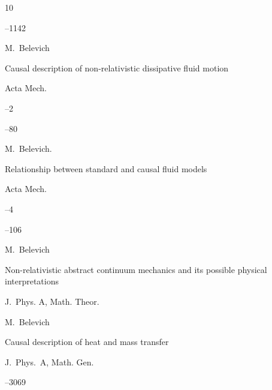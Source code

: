 \begin{thebibliography}{10}

--1142 







\by M.~Belevich

\paper Causal description of non-relativistic dissipative fluid motion

\jour  Acta Mech.

--2


--80







\by M.~Belevich.

\paper Relationship between standard and causal fluid models

\jour  Acta Mech.

--4


--106





\by M.~Belevich

\paper Non-relativistic abstract continuum mechanics and its possible physical interpretations

\jour  J.~Phys. A, Math. Theor. 











\by M.~Belevich

\paper Causal description of heat and mass transfer

\jour J.~Phys.~A, Math. Gen.



--3069 






\end{thebibliography}
